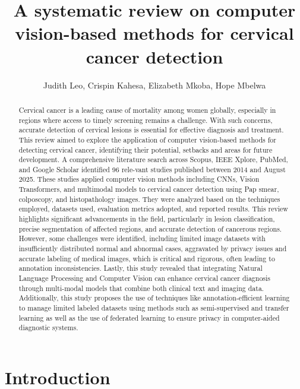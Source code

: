 \documentclass{svjour3}
\begin{document}
\title{A systematic review on computer vision-based methods for cervical cancer detection}
\author{
Judith Leo, 
Crispin Kahesa, 
Elizabeth Mkoba, 
Hope Mbelwa
}
\institute{
}
\maketitle
\begin{abstract}
Cervical cancer is a leading cause of mortality among women globally, especially in regions where access to timely screening remains a challenge. With such concerns, accurate detection of cervical lesions is essential for effective diagnosis and treatment. This review aimed to explore the application of computer vision-based methods for detecting cervical cancer, identifying their potential, setbacks and areas for future development. A comprehensive literature search across Scopus, IEEE Xplore, PubMed, and Google Scholar identified 96 rele-vant studies published between 2014 and August 2025. These studies applied computer vision methods including CNNs, Vision Transformers, and multimodal models to cervical cancer detection using Pap smear, colposcopy, and histopathology images. They were analyzed based on the techniques employed, datasets used, evaluation metrics adopted, and reported results. This review highlights significant advancements in the field, particularly in lesion classification, precise segmentation of affected regions, and accurate detection of cancerous regions. However, some challenges were identified, including limited image datasets with insufficiently distributed normal and abnormal cases, aggravated by privacy issues and accurate labeling of medical images, which is critical and rigorous, often leading to annotation inconsistencies. Lastly, this study revealed that integrating Natural Language Processing and Computer Vision can enhance cervical cancer diagnosis through multi-modal models that combine both clinical text and imaging data. Additionally, this study proposes the use of techniques like annotation-efficient learning to manage limited labeled datasets using methods such as semi-supervised and transfer learning as well as the use of federated learning to ensure privacy in computer-aided diagnostic systems.
\end{abstract}

\section{Introduction}
\end{document}
